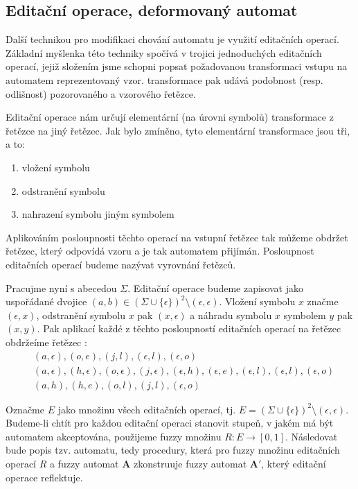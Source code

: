 \subsection{Editační operace, deformovaný automat} \label{sec:DefAut}
Další technikou pro modifikaci chování automatu je využití editačních operací. Základní myšlenka této techniky spočívá v trojici jednoduchých editačních operací, jejiž složením jsme schopni popsat požadovanou transformaci vstupu na automatem reprezentovaný vzor.  transformace pak udává podobnost (resp. odlišnost) pozorovaného a vzorového řetězce.

Editační operace nám určují elementární (na úrovni symbolů) transformace z řetězce na jiný řetězec. Jak bylo zmíněno, tyto elementární transformace jsou tři, a to:
\begin{enumerate}
 \item vložení symbolu
 \item odstranění symbolu
 \item nahrazení symbolu jiným symbolem
\end{enumerate}

Aplikováním posloupnosti těchto operací na vstupní řetězec tak můžeme obdržet řetězec, který odpovídá vzoru a je tak automatem přijímán. Posloupnost editačních operací budeme nazývat vyrovnání řetězců.

Pracujme nyní s abecedou $\Sigma$. Editační operace budeme zapisovat jako uspořádané dvojice $(a, b) \in (\Sigma \cup \{ \epsilon \})^2 \setminus (\epsilon, \epsilon)$. Vložení symbolu $x$ značme $(\epsilon, x)$, odstranění symbolu $x$ pak $(x, \epsilon)$ a náhradu symbolu $x$ symbolem $y$ pak $(x, y)$.  Pak aplikací každé z těchto posloupností editačních operací na řetězec  obdržeíme řetězec :
\begin{align*}
 & (a,\epsilon), (o,e), (j,l), (\epsilon,l), (\epsilon, o) \\
 & (a, \epsilon), (h,\epsilon), (o,\epsilon), (j,\epsilon), (\epsilon,h), (\epsilon,e), (\epsilon,l), (\epsilon,l), (\epsilon,o) \\
 & (a,h), (h,e), (o,l), (j,l), (\epsilon,o) 
\end{align*}

Označme $E$ jako množinu všech editačních operací, tj. $E = (\Sigma \cup \{ \epsilon \})^2 \setminus (\epsilon, \epsilon)$. Budeme-li chtít pro každou editační operaci stanovit stupeň, v jakém má být automatem akceptována, použijeme fuzzy množinu  $R: E \rightarrow [0, 1]$. Následovat bude popis tzv.  automatu, tedy procedury, která pro fuzzy množinu editačních operací $R$ a fuzzy automat $\mathbf{A}$ zkonstruuje fuzzy automat $\mathbf{A}'$, který editační operace reflektuje.


